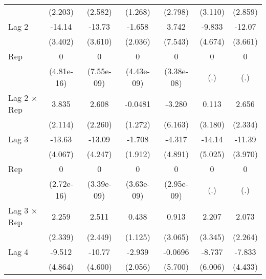 \begin{table}[htbp]
\begin{tabular}{l*{6}{c}}
                &  (2.203)         &  (2.582)         &  (1.268)         &  (2.798)         &  (3.110)         &  (2.859)         \\
\addlinespace
Lag 2           &   -14.14\sym{***}&   -13.73\sym{***}&   -1.658         &    3.742         &   -9.833\sym{*}  &   -12.07\sym{***}\\
                &  (3.402)         &  (3.610)         &  (2.036)         &  (7.543)         &  (4.674)         &  (3.661)         \\
\addlinespace
Rep             &        0         &        0         &        0         &        0         &        0         &        0         \\
                &(4.81e-16)         &(7.55e-09)         &(4.43e-09)         &(3.38e-08)         &      (.)         &      (.)         \\
\addlinespace
Lag 2 $\times$ Rep&    3.835         &    2.608         &  -0.0481         &   -3.280         &    0.113         &    2.656         \\
                &  (2.114)         &  (2.260)         &  (1.272)         &  (6.163)         &  (3.180)         &  (2.334)         \\
\addlinespace
Lag 3           &   -13.63\sym{***}&   -13.09\sym{**} &   -1.708         &   -4.317         &   -14.14\sym{**} &   -11.39\sym{**} \\
                &  (4.067)         &  (4.247)         &  (1.912)         &  (4.891)         &  (5.025)         &  (3.970)         \\
\addlinespace
Rep             &        0         &        0         &        0         &        0         &        0         &        0         \\
                &(2.72e-16)         &(3.39e-09)         &(3.63e-09)         &(2.95e-09)         &      (.)         &      (.)         \\
\addlinespace
Lag 3 $\times$ Rep&    2.259         &    2.511         &    0.438         &    0.913         &    2.207         &    2.073         \\
                &  (2.339)         &  (2.449)         &  (1.125)         &  (3.065)         &  (3.345)         &  (2.264)         \\
\addlinespace
Lag 4           &   -9.512         &   -10.77\sym{*}  &   -2.939         &  -0.0696         &   -8.737         &   -7.833         \\
                &  (4.864)         &  (4.600)         &  (2.056)         &  (5.700)         &  (6.006)         &  (4.433)         \\

\end{tabular}
\end{table}
